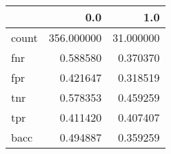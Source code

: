 \begin{tabular}{lrr}
\toprule
{} &         0.0 &        1.0 \\
\midrule
count &  356.000000 &  31.000000 \\
fnr   &    0.588580 &   0.370370 \\
fpr   &    0.421647 &   0.318519 \\
tnr   &    0.578353 &   0.459259 \\
tpr   &    0.411420 &   0.407407 \\
bacc  &    0.494887 &   0.359259 \\
\bottomrule
\end{tabular}
